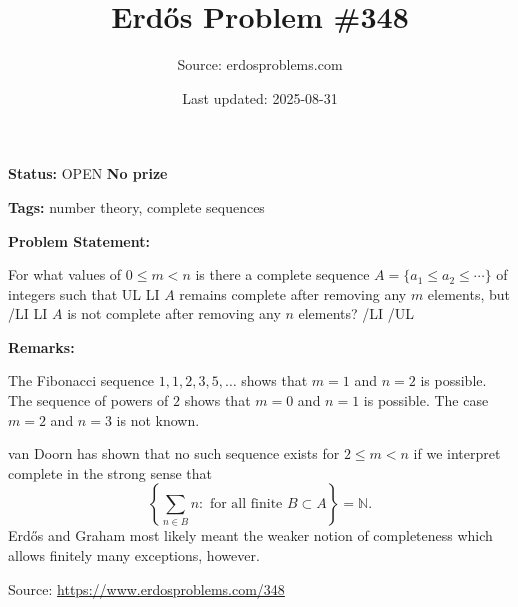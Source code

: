 \documentclass{article}
\title{Erd\H{o}s Problem \#348}
\date{Last updated: 2025-08-31}
\author{Source: erdosproblems.com}
\begin{document}
\maketitle

\noindent\textbf{Status:} OPEN \quad \textbf{No prize}

\noindent\textbf{Tags:} number theory, complete sequences

\medskip
\noindent\textbf{Problem Statement:}

For what values of $0\leq m<n$ is there a complete sequence $A=\{a_1\leq a_2\leq \cdots\}$ of integers such that
{UL}
{LI} $A$ remains complete after removing any $m$ elements, but {/LI}
{LI} $A$ is not complete after removing any $n$ elements? {/LI}
{/UL}

\bigskip
\noindent\textbf{Remarks:}

The Fibonacci sequence $1,1,2,3,5,\ldots$ shows that $m=1$ and $n=2$ is possible. The sequence of powers of $2$ shows that $m=0$ and $n=1$ is possible. The case $m=2$ and $n=3$ is not known.

van Doorn has shown that no such sequence exists for $2\leq m<n$ if we interpret complete in the strong sense that\[\left\{ \sum_{n\in B}n : \textrm{ for all finite }B\subset A\right\}=\mathbb{N}.\]Erd\H{o}s and Graham most likely meant the weaker notion of completeness which allows finitely many exceptions, however.

\bigskip
\noindent\small{Source: \url{https://www.erdosproblems.com/348}}
\end{document}
